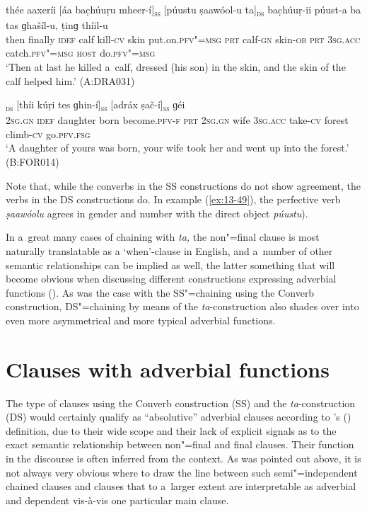 \begin{exe}
\ex
\label{ex:13-49}
\gll thée aaxeríi [áa bac̣húuṛu mheer-í]\textsc{\textsubscript{ss}} [púustu ṣaawóol-u ta]\textsc{\textsubscript{ds}} bac̣húuṛ-ii púust-a ba tas ɡhašíl-u, ṭinɡ thíil-u \\
then finally \textsc{idef} calf kill-\textsc{cv}  skin  put.on.\textsc{pfv"=msg} \textsc{prt} calf-\textsc{gn} skin-\textsc{ob} \textsc{prt} \textsc{3sg.acc}
catch.\textsc{pfv"=msg} \textsc{host} do.\textsc{pfv"=msg} \\
\glt `Then at last he killed a~calf, dressed (his son) in the skin, and the skin of the calf helped him.' (A:DRA031)

\ex
\label{ex:13-50}
\textsc{\textsubscript{ds}} [thíi kúṛi tes ɡhin-í]\textsc{\textsubscript{ss}} [adráx ṣač-í]\textsc{\textsubscript{ss}} ɡéi \\
\textsc{2sg.gn} \textsc{idef} daughter born become.\textsc{pfv-f} \textsc{prt} \textsc{2sg.gn}  wife \textsc{3sg.acc} take-\textsc{cv} forest climb-\textsc{cv} go.\textsc{pfv.fsg} \\
\glt `A daughter of yours was born, your wife took her and went up into the forest.' (B:FOR014) 
\end{exe}

Note that, while the converbs in the SS constructions do not show agreement, the verbs in the DS constructions do. In example (\ref{ex:13-49}), the perfective verb \textit{ṣaawóolu} agrees in gender and number with the direct object \textit{púustu}). 


In a~great many cases of chaining with \textit{ta,} the non"=final clause is most naturally translatable as a `when'-clause in English, and a~number of other semantic relationships can be implied as well, the latter something that will become obvious when discussing different constructions expressing adverbial functions (). As was the case with the SS"=chaining using the Converb construction, DS"=chaining by means of the \textit{ta}-construction also shades over into even more asymmetrical and more typical adverbial functions. 


\section{Clauses with adverbial functions}
\label{sec:13-4}

The type of clauses using the Converb construction (SS) and the \textit{ta}-construction (DS) would certainly qualify as ``absolutive'' adverbial clauses according to \citeauthor{thompsonetal2007}'s (\citeyear[264--266]{thompsonetal2007}) definition, due to their wide scope and their lack of explicit signals as to the exact semantic relationship between non"=final and final clauses. Their function in the discourse is often inferred from the context. As was pointed out above, it is not always very obvious where to draw the line between such semi"=independent chained clauses and clauses that to a~larger extent are interpretable as adverbial and dependent vis-à-vis one particular main clause. 



